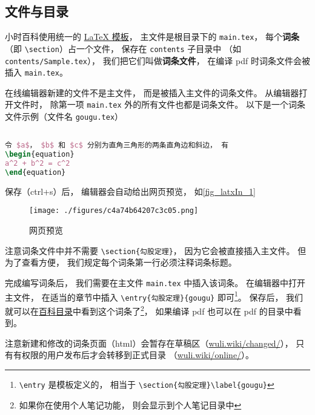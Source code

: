 

\subsection{文件与目录}

小时百科使用统一的 \href{https://github.com/MacroUniverse/PhysWiki}{LaTeX 模板}， 主文件是根目录下的 \verb|main.tex|， 每个\textbf{词条}（即 \verb|\section|）占一个文件， 保存在 \verb|contents| 子目录中 （如 \verb|contents/Sample.tex|）， 我们把它们叫做\textbf{词条文件}， 在编译 pdf 时词条文件会被插入 \verb|main.tex|。

在线编辑器新建的文件不是主文件， 而是被插入主文件的词条文件。 从编辑器打开文件时， 除第一项 \verb|main.tex| 外的所有文件也都是词条文件。 以下是一个词条文件示例（文件名 \verb|gougu.tex|）

\begin{lstlisting}[language=latex]
% 勾股定理

令 $a$， $b$ 和 $c$ 分别为直角三角形的两条直角边和斜边， 有
\begin{equation}
a^2 + b^2 = c^2
\end{equation}
\end{lstlisting}
保存（ctrl+s）后， 编辑器会自动给出网页预览， 如\autoref{fig_latxIn_1}~
\begin{figure}[ht]
\centering
\texttt{[image: ./figures/c4a74b64207c3c05.png]}
\caption{网页预览} \label{fig_editIn_1}
\end{figure}

注意词条文件中并不需要 \verb|\section{勾股定理}|， 因为它会被直接插入主文件。 但为了查看方便， 我们规定每个词条第一行必须注释词条标题。

完成编写词条后， 我们需要在主文件 \verb|main.tex| 中插入该词条。 在编辑器中打开主文件， 在适当的章节中插入 \verb|\entry{勾股定理}{gougu}| 即可\footnote{\verb|\entry| 是模板定义的， 相当于 \verb|\section{勾股定理}\label{gougu}|}。 保存后， 我们就可以在\href{https://wuli.wiki/changed}{百科目录}中看到这个词条了\footnote{如果你在使用个人笔记功能， 则会显示到个人笔记目录中}， 如果编译 pdf 也可以在 pdf 的目录中看到。

注意新建和修改的词条页面（html）会暂存在草稿区（\href{https://wuli.wiki/changed/}{wuli.wiki/changed/}）， 只有有权限的用户发布后才会转移到正式目录 （\href{https://wuli.wiki/online/}{wuli.wiki/online/}）。

